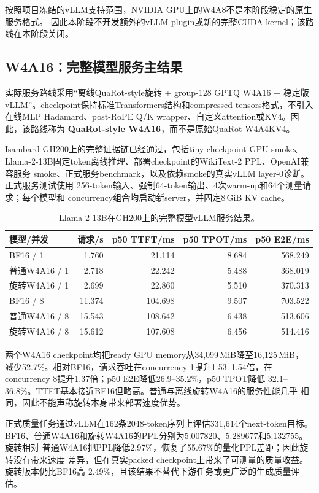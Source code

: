 \documentclass[11pt,a4paper]{ctexart}
\begin{document}
按照项目冻结的vLLM支持范围，NVIDIA GPU上的W4A8不是本阶段稳定的原生服务格式。
因此本阶段不开发额外的vLLM plugin或新的完整CUDA kernel；该路线在本阶段关闭。

\subsection*{W4A16：完整模型服务主结果}

实际服务路线采用“离线QuaRot-style旋转 + group-128 GPTQ W4A16 + 稳定版
vLLM”。checkpoint保持标准Transformers结构和compressed-tensors格式，不引入
在线MLP Hadamard、post-RoPE Q/K wrapper、自定义attention或KV4。因此，该路线称为
\textbf{QuaRot-style W4A16}，而不是原始QuaRot W4A4KV4。

Isambard GH200上的完整证据链已经通过，包括tiny checkpoint GPU smoke、
Llama-2-13B固定token离线推理、部署checkpoint的WikiText-2 PPL、OpenAI兼容服务
smoke、正式服务benchmark，以及依赖smoke的真实vLLM layer-0诊断。正式服务测试使用
256-token输入、强制64-token输出、4次warm-up和64个测量请求；每个模型和
concurrency组合均启动新server，并固定8\,GiB KV cache。

\begin{table}[htbp]
  \centering
  \small
  \begin{tabular}{@{}lrrrr@{}}
    \toprule
    模型/并发 & 请求/s & p50 TTFT/ms & p50 TPOT/ms & p50 E2E/ms \\
    \midrule
    BF16 / 1 & 1.760 & 21.114 & 8.684 & 568.249 \\
    普通W4A16 / 1 & 2.718 & 22.242 & 5.488 & 368.019 \\
    旋转W4A16 / 1 & 2.699 & 22.860 & 5.510 & 370.313 \\
    BF16 / 8 & 11.374 & 104.698 & 9.507 & 703.522 \\
    普通W4A16 / 8 & 15.543 & 108.642 & 6.438 & 513.606 \\
    旋转W4A16 / 8 & 15.612 & 107.608 & 6.456 & 514.416 \\
    \bottomrule
  \end{tabular}
  \caption{Llama-2-13B在GH200上的完整模型vLLM服务结果。}
\end{table}

两个W4A16 checkpoint均把ready GPU memory从34,099\,MiB降至16,125\,MiB，
减少52.7\%。相对BF16，请求吞吐在concurrency 1提升1.53--1.54倍，在
concurrency 8提升1.37倍；p50 E2E降低26.9--35.2\%，p50 TPOT降低
32.1--36.8\%。TTFT基本接近BF16但略高。普通与离线旋转W4A16的服务性能几乎
相同，因此不能声称旋转本身带来部署速度优势。

正式质量任务通过vLLM在162条2048-token序列上评估331,614个next-token目标。
BF16、普通W4A16和旋转W4A16的PPL分别为5.007820、5.289677和5.132755。旋转相对
普通W4A16把PPL降低2.97\%，恢复了55.67\%的量化PPL差距；因此旋转没有带来速度
差异，但在真实packed checkpoint上带来了可测量的质量收益。旋转版本仍比BF16高
2.49\%，且该结果不替代下游任务或更广泛的生成质量评估。
\end{document}
